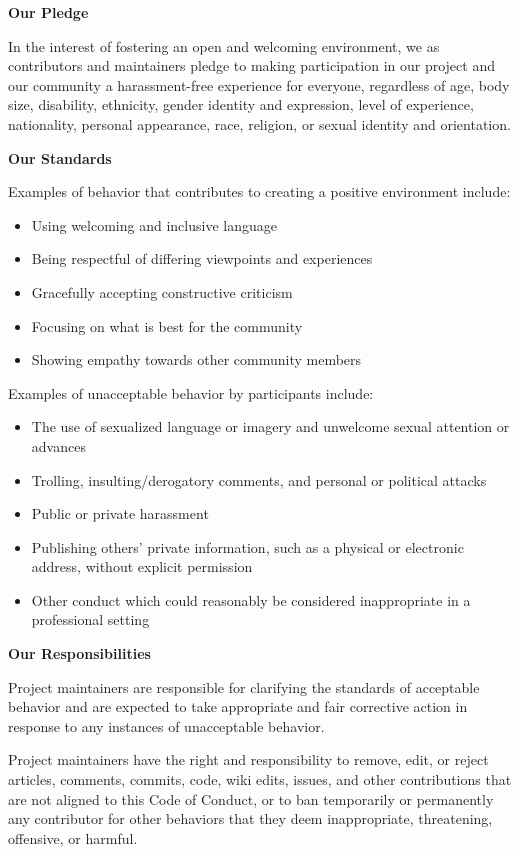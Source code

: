 \textbf{Our Pledge}

In the interest of fostering an open and welcoming environment, we as contributors and maintainers pledge to making participation in our project and our community a harassment-free experience for everyone, regardless of age, body size, disability, ethnicity, gender identity and expression, level of experience, nationality, personal appearance, race, religion, or sexual identity and orientation.

\bigskip

\textbf{Our Standards}

Examples of behavior that contributes to creating a positive environment include:
\begin{itemize}
  \item Using welcoming and inclusive language
  \item Being respectful of differing viewpoints and experiences
  \item Gracefully accepting constructive criticism
  \item Focusing on what is best for the community
  \item Showing empathy towards other community members
\end{itemize}

Examples of unacceptable behavior by participants include:
\begin{itemize}
  \item The use of sexualized language or imagery and unwelcome sexual attention or advances
  \item Trolling, insulting/derogatory comments, and personal or political attacks
  \item Public or private harassment
  \item Publishing others’ private information, such as a physical or electronic address, without explicit permission
  \item Other conduct which could reasonably be considered inappropriate in a professional setting
\end{itemize}

\bigskip

\textbf{Our Responsibilities}

Project maintainers are responsible for clarifying the standards of acceptable behavior and are expected to take appropriate and fair corrective action in response to any instances of unacceptable behavior.

Project maintainers have the right and responsibility to remove, edit, or reject articles, comments, commits, code, wiki edits, issues, and other contributions that are not aligned to this Code of Conduct, or to ban temporarily or permanently any contributor for other behaviors that they deem inappropriate, threatening, offensive, or harmful.

